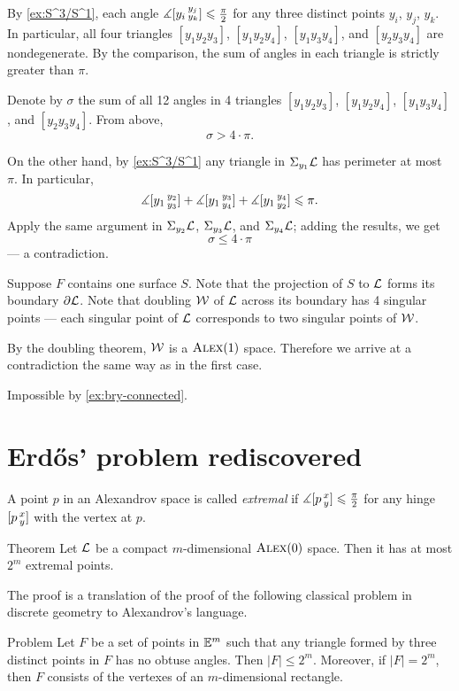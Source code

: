 By \ref{ex:S^3/S^1}, each angle $\measuredangle[y_i\,{}^{y_j}_{y_k}]\leqslant \tfrac\pi2$ for any three distinct points 
$y_i$, $y_j$, $y_k$.
In particular, all four triangles $[y_1y_2y_3]$, $[y_1y_2y_4]$, $[y_1y_3y_4]$, and $[y_2y_3y_4]$ are nondegenerate.
By the comparison, the sum of angles in each triangle is strictly greater than $\pi$.

Denote by $\sigma$ the sum of all 12 angles in 4 triangles $[y_1y_2y_3]$, $[y_1y_2y_4]$, $[y_1y_3y_4]$, and $[y_2y_3y_4]$.
From above,
\[\sigma>4\cdot\pi.\]

On the other hand, by \ref{ex:S^3/S^1} any triangle in $\Sigma_{y_1}\mathcal{L}$ has perimeter at most $\pi$.
In particular, 
\[\measuredangle[y_1\,{}^{y_2}_{y_3}]+\measuredangle[y_1\,{}^{y_3}_{y_4}]+\measuredangle[y_1\,{}^{y_4}_{y_2}]\leqslant \pi.\]
Apply the same argument in $\Sigma_{y_2}\mathcal{L}$, $\Sigma_{y_3}\mathcal{L}$, and $\Sigma_{y_4}\mathcal{L}$;
adding the results, we get 
\[\sigma\le 4\cdot\pi\]
--- a contradiction.

Suppose $F$ contains one surface $S$.
Note that the projection of $S$ to $\mathcal{L}$ forms its boundary $\partial \mathcal{L}$.
Note that doubling $\mathcal{W}$ of $\mathcal{L}$ across its boundary has 4 singular points --- each singular point of $\mathcal{L}$ corresponds to two singular points of $\mathcal{W}$.

By the doubling theorem, $\mathcal{W}$ is a $\textsc{Alex}(1)$ space.
Therefore we arrive at a contradiction the same way as in the first case.

 Impossible by \ref{ex:bry-connected}.
\qeds

\section{Erdős' problem rediscovered}

A point $p$ in an Alexandrov space is called \emph{extremal} if $\measuredangle[p\,{}^{x}_{y}]\leqslant \tfrac\pi2$ for any hinge $[p\,{}^{x}_{y}]$ with the vertex at $p$. 

\begin{thm}{Theorem}\label{thm:extr-point}
Let $\mathcal{L}$ be a compact $m$-dimensional $\textsc{Alex}(0)$ space.
Then it has at most $2^m$ extremal points.
\end{thm}

The proof is a translation of the proof of the following classical problem in discrete geometry to Alexandrov's language.

\begin{thm}{Problem}
Let $F$ be a set of points in $\mathbb{E}^m$ such that any triangle formed by three distinct points in $F$ has no obtuse angles.
Then  $|F|\le2^m$.
Moreover, if $|F|=2^m$, then $F$ consists of the vertexes of an $m$-dimensional rectangle.
\end{thm}

